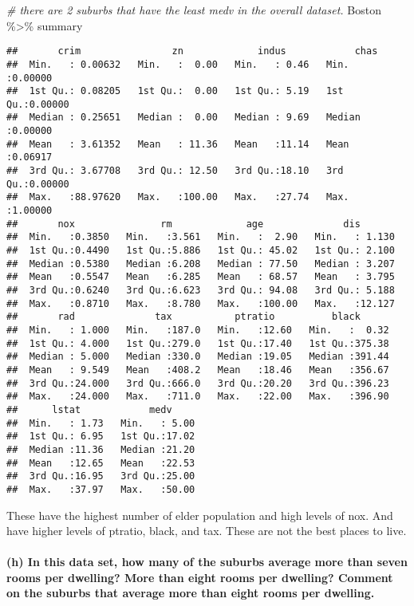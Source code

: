 \documentclass[
]{article}
\newenvironment{Shaded}{\begin{snugshade}}{\end{snugshade}}
\newcommand{\CommentTok}[1]{\textcolor[rgb]{0.56,0.35,0.01}{\textit{#1}}}
\newcommand{\NormalTok}[1]{#1}
\newcommand{\SpecialCharTok}[1]{\textcolor[rgb]{0.00,0.00,0.00}{#1}}
\begin{document}
\begin{Shaded}
\begin{Highlighting}[]
\CommentTok{\# there are 2 suburbs that have the least medv in the overall dataset.}
\NormalTok{Boston }\SpecialCharTok{\%\textgreater{}\%}\NormalTok{ summary}
\end{Highlighting}
\end{Shaded}

\begin{verbatim}
##       crim                zn             indus            chas        
##  Min.   : 0.00632   Min.   :  0.00   Min.   : 0.46   Min.   :0.00000  
##  1st Qu.: 0.08205   1st Qu.:  0.00   1st Qu.: 5.19   1st Qu.:0.00000  
##  Median : 0.25651   Median :  0.00   Median : 9.69   Median :0.00000  
##  Mean   : 3.61352   Mean   : 11.36   Mean   :11.14   Mean   :0.06917  
##  3rd Qu.: 3.67708   3rd Qu.: 12.50   3rd Qu.:18.10   3rd Qu.:0.00000  
##  Max.   :88.97620   Max.   :100.00   Max.   :27.74   Max.   :1.00000  
##       nox               rm             age              dis        
##  Min.   :0.3850   Min.   :3.561   Min.   :  2.90   Min.   : 1.130  
##  1st Qu.:0.4490   1st Qu.:5.886   1st Qu.: 45.02   1st Qu.: 2.100  
##  Median :0.5380   Median :6.208   Median : 77.50   Median : 3.207  
##  Mean   :0.5547   Mean   :6.285   Mean   : 68.57   Mean   : 3.795  
##  3rd Qu.:0.6240   3rd Qu.:6.623   3rd Qu.: 94.08   3rd Qu.: 5.188  
##  Max.   :0.8710   Max.   :8.780   Max.   :100.00   Max.   :12.127  
##       rad              tax           ptratio          black       
##  Min.   : 1.000   Min.   :187.0   Min.   :12.60   Min.   :  0.32  
##  1st Qu.: 4.000   1st Qu.:279.0   1st Qu.:17.40   1st Qu.:375.38  
##  Median : 5.000   Median :330.0   Median :19.05   Median :391.44  
##  Mean   : 9.549   Mean   :408.2   Mean   :18.46   Mean   :356.67  
##  3rd Qu.:24.000   3rd Qu.:666.0   3rd Qu.:20.20   3rd Qu.:396.23  
##  Max.   :24.000   Max.   :711.0   Max.   :22.00   Max.   :396.90  
##      lstat            medv      
##  Min.   : 1.73   Min.   : 5.00  
##  1st Qu.: 6.95   1st Qu.:17.02  
##  Median :11.36   Median :21.20  
##  Mean   :12.65   Mean   :22.53  
##  3rd Qu.:16.95   3rd Qu.:25.00  
##  Max.   :37.97   Max.   :50.00
\end{verbatim}

These have the highest number of elder population and high levels of
nox. And have higher levels of ptratio, black, and tax. These are not
the best places to live.

\hypertarget{h-in-this-data-set-how-many-of-the-suburbs-average-more-than-seven-rooms-per-dwelling-more-than-eight-rooms-per-dwelling-comment-on-the-suburbs-that-average-more-than-eight-rooms-per-dwelling.}{%
\paragraph{(h) In this data set, how many of the suburbs average more
than seven rooms per dwelling? More than eight rooms per dwelling?
Comment on the suburbs that average more than eight rooms per
dwelling.}\label{h-in-this-data-set-how-many-of-the-suburbs-average-more-than-seven-rooms-per-dwelling-more-than-eight-rooms-per-dwelling-comment-on-the-suburbs-that-average-more-than-eight-rooms-per-dwelling.}}
\end{document}
